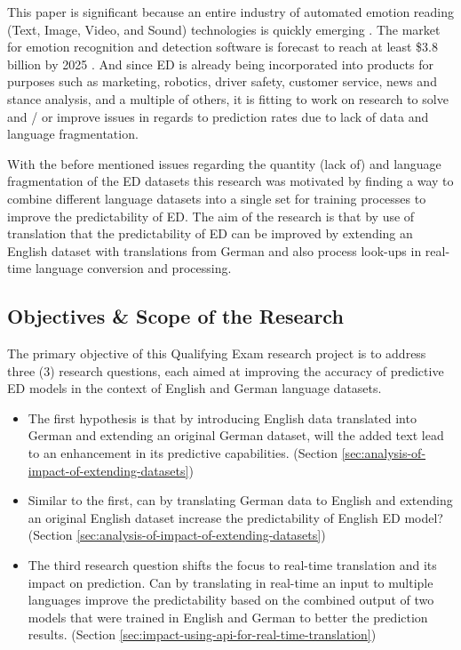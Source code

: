 \documentclass[11pt]{article}
\begin{document}
This paper is significant because an entire industry of automated emotion reading (Text, Image, Video, and Sound) technologies is quickly emerging \cite{ACLU-ED-Data, ACLU-THE-DAWN-OF-ROBOT-SURVEILLANCE}. The market for emotion recognition and detection software is forecast to reach at least \$3.8 billion by 2025 \cite{ACLU-ED-Data, ACLU-THE-DAWN-OF-ROBOT-SURVEILLANCE}. And since ED is already being incorporated into products for purposes such as marketing, robotics, driver safety, customer service, news and stance analysis, and a multiple of others, it is fitting to work on research to solve and / or improve issues in regards to prediction rates due to lack of data and language fragmentation.

With the before mentioned issues regarding the quantity (lack of) and language fragmentation of the ED datasets this research was motivated by finding a way to combine different language datasets into a single set for training processes to improve the predictability of ED. The aim of the research is that by use of translation that the predictability of ED can be improved by extending an English dataset with translations from German and also process look-ups in real-time language conversion and processing.

\subsection{Objectives \& Scope of the Research}

The primary objective of this Qualifying Exam research project is to address three (3) research questions, each aimed at improving the accuracy of predictive ED models in the context of English and German language datasets.

\begin{itemize}
\item The first hypothesis is that by introducing English data translated into German and extending an original German dataset, will the added text lead to an enhancement in its predictive capabilities. (Section \ref{sec:analysis-of-impact-of-extending-datasets})
\item Similar to the first, can by translating German data to English and extending an original English dataset increase the predictability of English ED model? (Section \ref{sec:analysis-of-impact-of-extending-datasets})
\item The third research question shifts the focus to real-time translation and its impact on prediction. Can by translating in real-time an input to multiple languages improve the predictability based on the combined output of two models that were trained in English and German to better the prediction results. (Section \ref{sec:impact-using-api-for-real-time-translation})
\end{itemize}
\end{document}
